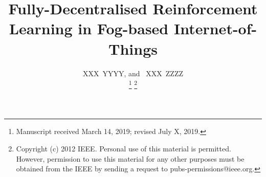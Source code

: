 \documentclass[journal]{IEEEtran}
\begin{document}
%
\title{Fully-Decentralised Reinforcement Learning in Fog-based Internet-of-Things}
%
%
%

\author{XXX~YYYY,
        and~ XXX~ZZZZ%

\thanks{Manuscript received March 14, 2019; revised July X, 2019.}
\thanks{Copyright (c) 2012 IEEE. Personal use of this material is permitted. However, permission to use this material for any other purposes must be obtained from the IEEE by sending a request to pubs-permissions@ieee.org.}
}

%
%
\end{document}
